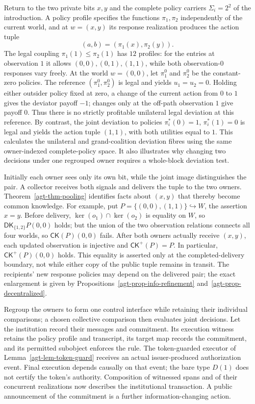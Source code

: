 \documentclass[11pt,a4paper]{article}
\numberwithin{equation}{section}
\theoremstyle{definition}
\theoremstyle{remark}
\theoremstyle{plain}
\providecommand{\DK}{\mathsf{DK}}
\providecommand{\CK}{\mathsf{CK}}
\begin{document}
Return to the two private bits $x,y$ and the complete policy carriers
$\Sigma_i=2^2$ of the introduction. A policy profile specifies the
functions $\pi_1,\pi_2$ independently of the current world, and at
$w=(x,y)$ its response realization produces the action tuple
\[
 (a,b)=(\pi_1(x),\pi_2(y)).
\]
The legal coupling $\pi_1(1)\leq\pi_2(1)$ has $12$ profiles: for
the entries at observation $1$ it allows $(0,0),(0,1),(1,1)$,
while both observation-$0$ responses vary freely. At the world
$w=(0,0)$, let $\pi_1^0$ and $\pi_2^0$ be the constant-zero
policies. The reference $(\pi_1^0,\pi_2^0)$ is legal and yields
$u_1=u_2=0$. Holding either outsider policy fixed at zero, a change
of the current action from $0$ to $1$ gives the deviator payoff $-1$;
changes only at the off-path observation $1$ give payoff $0$. Thus
there is no strictly profitable unilateral legal deviation at this
reference. By contrast, the joint deviation to policies
$\pi_i^*(0)=1$, $\pi_i^*(1)=0$ is legal and yields the action tuple
$(1,1)$, with both utilities equal to $1$. This calculates the
unilateral and grand-coalition deviation fibres using the same
owner-indexed complete-policy space. It also illustrates why
changing two decisions under one regrouped owner requires a
whole-block deviation test.

Initially each owner sees only its own bit, while the joint image distinguishes the pair.
A collector receives both signals and delivers the tuple to the two
owners. Theorem~\ref{agt-thm-pooling} identifies facts about $(x,y)$
that thereby become common knowledge. For example, put
$P=\{(0,0),(1,1)\}\hookrightarrow W$, the assertion $x=y$.
Before delivery, $\ker(o_1)\cap\ker(o_2)$ is equality on $W$,
so $\DK_{\{1,2\}}P(0,0)$ holds; but the union of the two
observation relations connects all four worlds, so
$\CK(P)(0,0)$ fails. After both owners actually receive $(x,y)$,
each updated observation is injective and
$\CK^{+}(P)=P$. In particular, $\CK^{+}(P)(0,0)$ holds.
This equality is asserted only at the completed-delivery boundary,
not while either copy of the public tuple remains in transit. The recipients' new response
policies may depend on the delivered pair; the exact enlargement is
given by Propositions~\ref{agt-prop-info-refinement}
and~\ref{agt-prop-decentralized}.

Regroup the owners to form one control interface while retaining
their individual comparisons; a chosen collective comparison then
evaluates joint decisions. Let the institution record their messages
and commitment. Its execution witness retains the policy profile and
transcript, its target map records the commitment, and its permitted
subobject enforces the rule. The token-guarded executor of
Lemma~\ref{agt-lem-token-guard} receives an actual issuer-produced
authorization event. Final execution depends causally on that event;
the bare type $D(1)$ does not certify the token's authority.
Composition of witnessed spans and of their concurrent realizations
now describes the institutional transaction. A public announcement of
the commitment is a further information-changing action.
\end{document}
